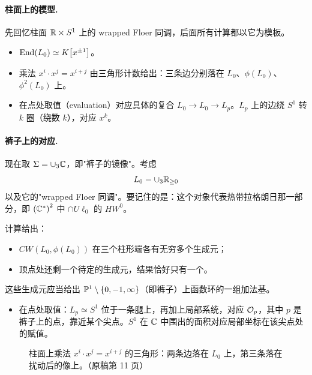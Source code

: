 \paragraph{柱面上的模型.} 先回忆柱面 $\mathbb{R}\times S^1$ 上的 wrapped Floer 同调，后面所有计算都以它为模板。
\begin{itemize}
  \item $\operatorname{End}(L_0)\simeq K\bigl[x^{\pm1}\bigr]$。
  \item 乘法 $x^i\cdot x^j=x^{i+j}$ 由三角形计数给出：三条边分别落在 $L_0$、$\phi(L_0)$、$\phi^2(L_0)$ 上。
  \item 在点处取值（evaluation）对应具体的复合 $L_0\to L_0\to L_p$。$L_p$ 上的边绕 $S^1$ 转 $k$ 圈（绕数 $k$），对应 $x^k$。
\end{itemize}

\paragraph{裤子上的对应.} 现在取 $\Sigma=\cup_3\mathbb{C}$，即"裤子的镜像"。考虑
\[
L_0=\cup_3\mathbb{R}_{\ge0}
\]
以及它的"wrapped Floer 同调"。要记住的是：这个对象代表热带拉格朗日那一部分，即 $\left(\mathbb{C}^*\right)^2$ 中 $\cap U\ell_0$ 的 $HW^0$。

计算给出：
\begin{itemize}
  \item $CW(L_0,\phi(L_0))$ 在三个柱形端各有无穷多个生成元；
  \item 顶点处还剩一个待定的生成元，结果恰好只有一个。
\end{itemize}
这些生成元应当给出 $\mathbb{P}^1\setminus\{0,-1,\infty\}$（即裤子）上函数环的一组加法基。
\begin{itemize}
  \item 在点处取值：$L_p\simeq S^1$ 位于一条腿上，再加上局部系统，对应 $\mathcal{O}_p$，其中 $p$ 是裤子上的点，靠近某个尖点。$S^1$ 在 $\mathbb{C}$ 中围出的面积对应局部坐标在该尖点处的赋值。
\end{itemize}

\begin{figure}[htbp]
\centering
{}
\caption{柱面上乘法 $x^i\cdot x^j=x^{i+j}$ 的三角形：两条边落在 $L_0$ 上，第三条落在扰动后的像上。（原稿第 11 页）}
\label{fig:cylinder}
\end{figure}

